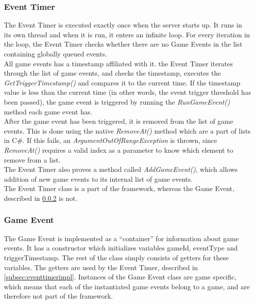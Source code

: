 \subsubsection{Event Timer}
\label{sec:eventtimerimpl}
The Event Timer is executed exactly once when the server starts up. It runs in its own thread and when it is run, it enters an infinite loop. For every iteration in the loop, the Event Timer checks whether there are no Game Events in the list containing globally queued events.\\

All game events has a timestamp affiliated with it. the Event Timer iterates through the list of game events, and checks the timestamp, executes the \textit{GetTriggerTimestamp()} and compares it to the current time. If the timestamp value is less than the current time (in other words, the event trigger threshold has been passed), the game event is triggered by running the \textit{RunGameEvent()} method each game event has.\\

After the game event has been triggered, it is removed from the list of game events. This is done using the native \textit{RemoveAt()} method which are a part of lists in C\#. If this fails, an \textit{ArgumentOutOfRangeException} is thrown, since \textit{RemoveAt()} requires a valid index as a parameter to know which element to remove from a list.\\

The Event Timer also proves a method called \textit{AddGameEvent()}, which allows addition of new game events to its internal list of game events.\\

The Event Timer class is a part of the framework, whereas the Game Event, described in \cref{subsec:geventImpl} is not.

\subsubsection{Game Event}\label{subsec:geventImpl}
The Game Event is implemented as a ``container'' for information about game events. It has a constructor which initializes variables gameId, eventType and triggerTimestamp. The rest of the class simply consists of getters for these variables. The getters are used by the Event Timer, described in \cref{subsec:eventtimerimpl}. Instances of the Game Event class are game specific, which means that each of the instantiated game events belong to a game, and are therefore not part of the framework.